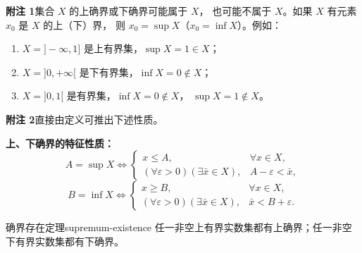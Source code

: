 \textbf{附注 1}\quad 集合 \(X\) 的上确界或下确界可能属于 \(X\)，
也可能不属于 \(X\)。如果 \(X\) 有元素 \(x_0\) 是 \(X\) 的上（下）界，
则 \(x_0=\sup X\)（\(x_0=\inf X\)）。例如：
\begin{enumerate}[label=\roman*)]
  \item \(X=]-\infty,1]\) 是上有界集，\(\sup X=1\in X\)；
  \item \(X=]0,+\infty[\) 是下有界集，\(\inf X=0\notin X\)；
  \item \(X=]0,1[\) 是有界集，\(\inf X=0\notin X\)，
  \(\sup X=1\notin X\)。
\end{enumerate}

\textbf{附注 2}\quad 直接由定义可推出下述性质。

\textbf{上、下确界的特征性质：}
\[
A=\sup X\Longleftrightarrow
\begin{cases}
x\leqslant A,&\forall x\in X,\\
(\forall\varepsilon>0)(\exists\bar x\in X),&
A-\varepsilon<\bar x,
\end{cases}
\]
\[
B=\inf X\Longleftrightarrow
\begin{cases}
x\geqslant B,&\forall x\in X,\\
(\forall\varepsilon>0)(\exists\bar x\in X),&
\bar x<B+\varepsilon.
\end{cases}
\]

\begin{mythm}{确界存在定理}{supremum-existence}
任一非空上有界实数集都有上确界；任一非空下有界实数集都有下确界。
\end{mythm}

